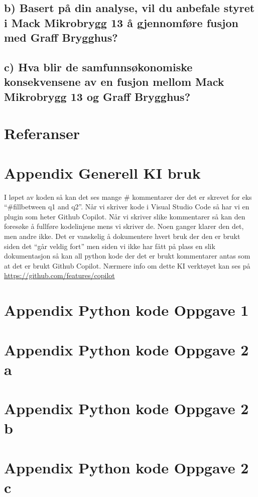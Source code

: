 \documentclass[
  12pt,
  a4paper,
  DIV=11,
  numbers=noendperiod]{scrartcl}
\begin{document}
\subsection{b) Basert på din analyse, vil du anbefale styret i Mack
Mikrobrygg 13 å gjennomføre fusjon med Graff
Brygghus?}\label{b-basert-puxe5-din-analyse-vil-du-anbefale-styret-i-mack-mikrobrygg-13-uxe5-gjennomfuxf8re-fusjon-med-graff-brygghus}

\subsection{c) Hva blir de samfunnsøkonomiske konsekvensene av en fusjon
mellom Mack Mikrobrygg 13 og Graff
Brygghus?}\label{c-hva-blir-de-samfunnsuxf8konomiske-konsekvensene-av-en-fusjon-mellom-mack-mikrobrygg-13-og-graff-brygghus}

\clearpage

\section{Referanser}\label{referanser}

\appendix

\section {Appendix Generell KI bruk}

I løpet av koden så kan det ses mange \# kommentarer der det er skrevet
for eks ``\#fillbetween q1 and q2''. Når vi skriver kode i Visual Studio
Code så har vi en plugin som heter Github Copilot. Når vi skriver slike
kommentarer så kan den foresøke å fullføre kodelinjene mens vi skriver
de. Noen ganger klarer den det, men andre ikke. Det er vanskelig å
dokumentere hvert bruk der den er brukt siden det ``går veldig fort''
men siden vi ikke har fått på plass en slik dokumentasjon så kan all
python kode der det er brukt kommentarer antas som at det er brukt
Github Copilot. Nærmere info om dette KI verktøyet kan ses på
\url{https://github.com/features/copilot}

\clearpage

\section {Appendix Python kode Oppgave 1}

\clearpage

\section {Appendix Python kode Oppgave 2 a}

\clearpage

\section {Appendix Python kode Oppgave 2 b}

\clearpage

\section {Appendix Python kode Oppgave 2 c}
\end{document}
